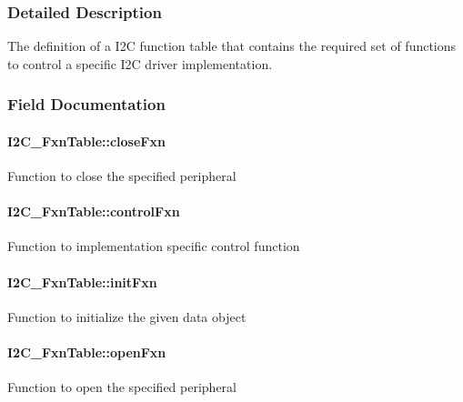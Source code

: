 \subsubsection{Detailed Description}
The definition of a I2\-C function table that contains the required set of functions to control a specific I2\-C driver implementation. 

\subsubsection{Field Documentation}
\paragraph[{close\-Fxn}]{ I2\-C\-\_\-\-Fxn\-Table\-::close\-Fxn}\label{struct_i2_c___fxn_table_a02f4e6a7daeb64d6741372a5636eedb5}
Function to close the specified peripheral 
\paragraph[{control\-Fxn}]{ I2\-C\-\_\-\-Fxn\-Table\-::control\-Fxn}\label{struct_i2_c___fxn_table_af23db6bdc9b619633fb70ddff44412ea}
Function to implementation specific control function 
\paragraph[{init\-Fxn}]{ I2\-C\-\_\-\-Fxn\-Table\-::init\-Fxn}\label{struct_i2_c___fxn_table_ae27540a7175c9ad14b590ddc92e06390}
Function to initialize the given data object 
\paragraph[{open\-Fxn}]{ I2\-C\-\_\-\-Fxn\-Table\-::open\-Fxn}\label{struct_i2_c___fxn_table_afb8c5f67ba6d0941f6265707083b16f8}
Function to open the specified peripheral 
